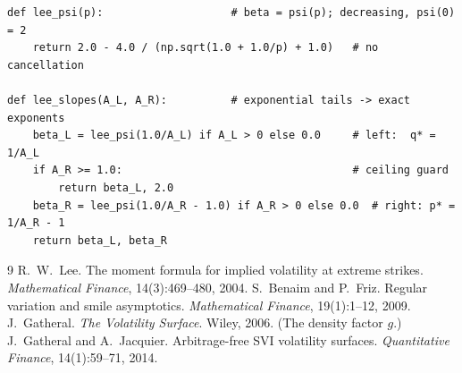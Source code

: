 \documentclass[11pt]{article}
\begin{document}
\begin{lstlisting}[caption={Lee's $\psi$ (stable form) and the LQD
structural wing slopes from the endpoint scales (distilled from
\texttt{models/lqd/basis.py}).},label={lst:lee}]
def lee_psi(p):                    # beta = psi(p); decreasing, psi(0) = 2
    return 2.0 - 4.0 / (np.sqrt(1.0 + 1.0/p) + 1.0)   # no cancellation

def lee_slopes(A_L, A_R):          # exponential tails -> exact exponents
    beta_L = lee_psi(1.0/A_L) if A_L > 0 else 0.0     # left:  q* = 1/A_L
    if A_R >= 1.0:                                    # ceiling guard
        return beta_L, 2.0
    beta_R = lee_psi(1.0/A_R - 1.0) if A_R > 0 else 0.0  # right: p* = 1/A_R - 1
    return beta_L, beta_R
\end{lstlisting}

\begin{thebibliography}{9}
 R.~W.~Lee.  The moment formula for implied volatility
at extreme strikes.  \emph{Mathematical Finance}, 14(3):469--480, 2004.
 S.~Benaim and P.~Friz.  Regular variation and
smile asymptotics.  \emph{Mathematical Finance}, 19(1):1--12, 2009.
 J.~Gatheral.  \emph{The Volatility Surface}.
Wiley, 2006.  (The density factor $g$.)
 J.~Gatheral and A.~Jacquier.
Arbitrage-free SVI volatility surfaces.  \emph{Quantitative Finance},
14(1):59--71, 2014.
\end{thebibliography}
\end{document}
